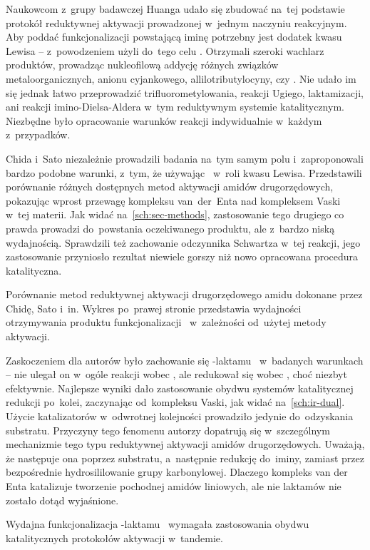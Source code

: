 Naukowcom z~grupy badawczej Huanga udało się zbudować na~tej podstawie protokół reduktywnej
  aktywacji prowadzonej w~jednym naczyniu reakcyjnym.
Aby poddać funkcjonalizacji powstającą iminę potrzebny jest dodatek kwasu Lewisa \---
  \citeauthor{ou18} z~powodzeniem użyli do~tego celu .
Otrzymali szeroki wachlarz produktów, prowadząc nukleofilową addycję różnych związków
  metaloorganicznych, anionu cyjankowego, allilotributylocyny, czy .
Nie udało im się jednak łatwo przeprowadzić trifluorometylowania, reakcji Ugiego, laktamizacji,
  ani reakcji imino-Dielsa-Aldera w~tym reduktywnym systemie katalitycznym.
Niezbędne było opracowanie warunków reakcji indywidualnie w~każdym z~przypadków.

Chida i~Sato niezależnie prowadzili badania na~tym samym polu i~zaproponowali bardzo podobne
  warunki, z~tym, że używając~ w~roli kwasu Lewisa.
Przedstawili porównanie różnych dostępnych metod aktywacji amidów drugorzędowych,
  pokazując wprost przewagę kompleksu van~der~Enta nad kompleksem Vaski w~tej materii.
Jak widać na~\cref{sch:sec-methods}, zastosowanie tego drugiego co prawda prowadzi
  do~powstania oczekiwanego produktu, ale z~bardzo niską wydajnością.
Sprawdzili też zachowanie odczynnika Schwartza w~tej reakcji, jego zastosowanie przyniosło
  rezultat niewiele gorszy niż nowo opracowana procedura katalityczna.
\begin{scheme*}
  
  \caption{
    Porównanie metod reduktywnej aktywacji drugorzędowego amidu dokonane przez Chidę, Sato i~in.
    Wykres po~prawej stronie przedstawia wydajności otrzymywania produktu
      funkcjonalizacji~ w~zależności od~użytej metody aktywacji.
  }
  \label{sch:sec-methods}
\end{scheme*}

Zaskoczeniem dla autorów było zachowanie się \textgamma{}-laktamu~
  w~badanych warunkach \--- nie ulegał on w~ogóle reakcji wobec ,
  ale redukował się wobec \vaska{}, choć niezbyt efektywnie.
Najlepsze wyniki dało zastosowanie obydwu systemów katalitycznej redukcji po~kolei,
  zaczynając od~kompleksu Vaski, jak widać na~\cref{sch:ir-dual}.
Użycie katalizatorów w~odwrotnej kolejności prowadziło jedynie do~odzyskania substratu.
Przyczyny tego fenomenu autorzy dopatrują się w~szczególnym mechanizmie tego typu
  reduktywnej aktywacji amidów drugorzędowych.
Uważają, że następuje ona poprzez  substratu, a~następnie redukcję do~iminy,
  zamiast przez bezpośrednie hydrosililowanie grupy karbonylowej.
Dlaczego kompleks van der Enta katalizuje tworzenie  pochodnej amidów liniowych,
  ale nie laktamów nie zostało dotąd wyjaśnione.
\begin{scheme*}
  
  \caption{
    Wydajna funkcjonalizacja \textgamma{}-laktamu~ wymagała zastosowania
      obydwu katalitycznych protokołów aktywacji w~tandemie.
  }
  \label{sch:ir-dual}
\end{scheme*}

